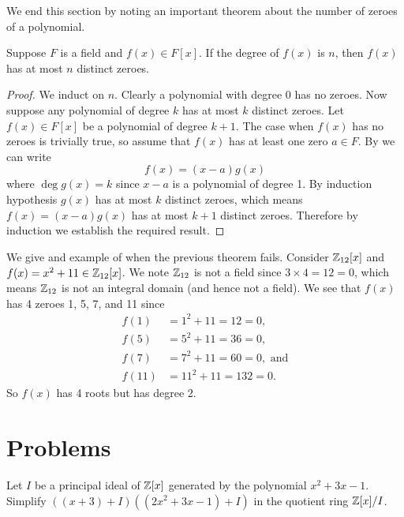 We end this section by noting an important theorem about the number of zeroes of a polynomial.
\begin{theorem}
    Suppose $F$ is a field and $f(x) \in F[x]$. If the degree of $f(x)$ is $n$, then $f(x)$ has at most $n$ distinct zeroes.
\end{theorem}
\begin{proof}
    We induct on $n$. Clearly a polynomial with degree 0 has no zeroes. Now suppose any polynomial of degree $k$ has at most $k$ distinct zeroes. Let $f(x) \in F[x]$ be a polynomial of degree $k + 1$. The case when $f(x)$ has no zeroes is trivially true, so assume that $f(x)$ has at least one zero $a \in F$. By  we can write
    \[
        f(x) = (x-a)g(x)
    \]
    where $\deg g(x) = k$ since $x-a$ is a polynomial of degree 1. By induction hypothesis $g(x)$ has at most $k$ distinct zeroes, which means $f(x) = (x-a)g(x)$ has at most $k + 1$ distinct zeroes. Therefore by induction we establish the required result.
\end{proof}

\begin{example}
    We give and example of when the previous theorem fails. Consider $\mathbb{Z}_{12}[x]$ and $f(x) = x^2 + 11 \in \mathbb{Z}_{12}[x]$. We note $\mathbb{Z}_{12}$ is not a field since $3 \times 4 = 12 = 0$, which means $\mathbb{Z}_{12}$ is not an integral domain (and hence not a field). We see that $f(x)$ has 4 zeroes 1, 5, 7, and 11 since
    \begin{align*}
        f(1) &= 1^2 + 11 = 12 = 0,\\
        f(5) &= 5^2 + 11 = 36 = 0,\\
        f(7) &= 7^2 + 11 = 60 = 0, \text{ and}\\
        f(11) &= 11^2 + 11 = 132 = 0.
    \end{align*}
    So $f(x)$ has 4 roots but has degree 2.
\end{example}

\newpage

\section{Problems}
\begin{problem}
    Let $I$ be a principal ideal of $\mathbb{Z}[x]$ generated by the polynomial $x^2 + 3x - 1$. Simplify $\left((x + 3) + I\right)\left((2x^2 + 3x - 1) + I\right)$ in the quotient ring $\mathbb{Z}[x]/I$.
\end{problem}

